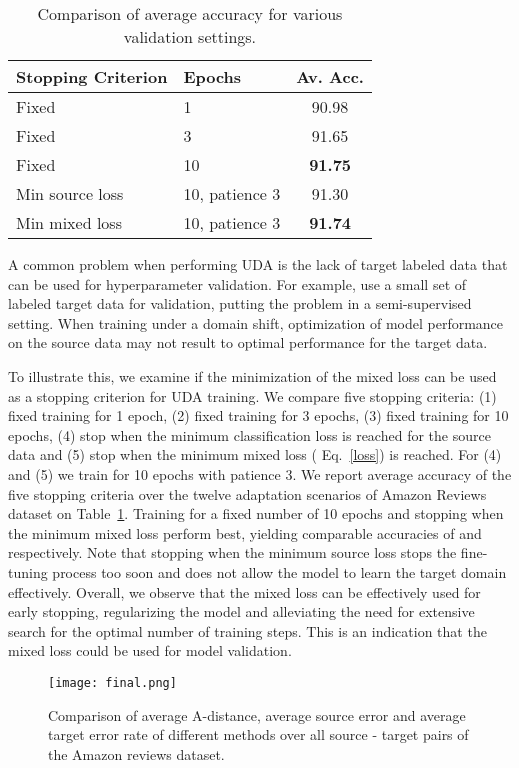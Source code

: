 \documentclass[11pt]{article}
\begin{document}
\begin{table}[b]
\centering
\begin{tabular}{|l l c|}
\hline
Stopping Criterion & Epochs & Av. Acc. \\
\hline
\hline
Fixed  & 1 & 90.98  \\
Fixed  & 3 & 91.65 \\
Fixed  & 10 & \textbf{91.75} \\
Min source loss & 10, patience 3 & 91.30 \\
Min mixed loss & 10, patience 3 & \textbf{91.74} \\
\hline
\end{tabular}
\caption{Comparison of average accuracy for various validation settings.}
\label{validation}
\end{table}



A common problem when performing UDA is the lack of target labeled data that can be used for hyperparameter validation. For example, \citet{ruder-plank-2018-strong} use a small set of labeled target data for validation, putting the problem in a semi-supervised setting. When training under a domain shift, optimization of model performance on the source data may not result to optimal performance for the target data. 

To illustrate this, we examine if the minimization of the mixed loss can be used as a stopping criterion for UDA training.
We compare five stopping criteria: (1) fixed training for 1 epoch, (2) fixed training for 3 epochs, (3) fixed training for 10 epochs, 
(4) stop when the minimum classification loss is reached for the source data and (5) stop when the minimum mixed loss ( Eq.~\ref{loss}) is reached. For (4) and (5) we train for 10 epochs with patience 3. 
We report average accuracy of the five stopping criteria over the twelve adaptation scenarios of Amazon Reviews dataset on Table~\ref{validation}. 
Training for a fixed number of 10 epochs and stopping when the minimum mixed loss perform best, yielding comparable accuracies of  and  respectively.
Note that stopping when the minimum source loss stops the fine-tuning process too soon and does not allow the model to learn the target domain effectively.
Overall, we observe that the mixed loss can be effectively used for early stopping, regularizing the model and alleviating the need for extensive search for the optimal number of training steps.
This is an indication that the mixed loss could be used for model validation.

\begin{figure*}[ht]
\centering
\texttt{[image: final.png]}
\caption{Comparison of average A-distance, average source error and average target error rate of different methods over all source - target pairs of the Amazon reviews dataset. }
\label{fig:adistance}
\end{figure*}
\end{document}
